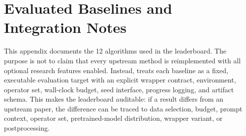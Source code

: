 \section{Evaluated Baselines and Integration Notes}
\label{app:evaluated-baselines}

This appendix documents the 12 algorithms used in the \core{} leaderboard. The purpose is not to claim that every upstream method is reimplemented with all optional research features enabled. Instead, \arena{} treats each baseline as a fixed, executable evaluation target with an explicit wrapper contract, environment, operator set, wall-clock budget, seed interface, progress logging, and artifact schema. This makes the leaderboard auditable: if a result differs from an upstream paper, the difference can be traced to data selection, budget, prompt context, operator set, pretrained-model distribution, wrapper variant, or postprocessing.

